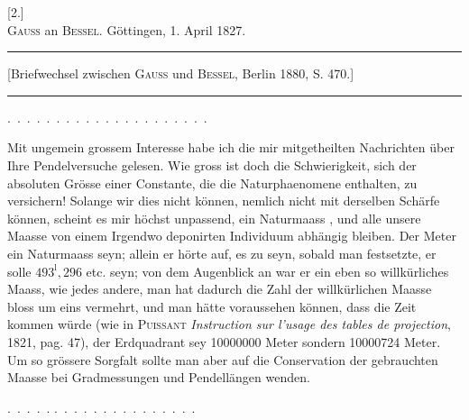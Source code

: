 \clearpage\begingroup{}
\begin{center}
[2.]\\[.7em]
\textsc{Gauss} an \textsc{Bessel}. Göttingen, 1. April 1827.
\par\medskip\rule{.78\textwidth}{.35pt}\par
{\small [Briefwechsel zwischen \textsc{Gauss} und \textsc{Bessel}, Berlin 1880, S. 470.]}\par
\rule{.78\textwidth}{.35pt}
\end{center}
\noindent .\ .\ .\ .\ .\ .\ .\ .\ .\ .\ .\ .\ .\ .\ .\ .\ .\ .\ .\ .\ .
\par\noindent\hspace*{\parindent}Mit ungemein grossem Interesse habe ich die mir mitgetheilten Nachrichten
über Ihre Pendelversuche gelesen. Wie gross ist doch die Schwierigkeit,
sich der absoluten Grösse einer Constante, die die Naturphaenomene
enthalten, zu versichern! Solange wir dies nicht können, nemlich nicht mit
derselben Schärfe können, scheint es mir höchst unpassend, ein Naturmaass
, und  alle unsere Maasse
von einem Irgendwo deponirten Individuum abhängig bleiben. Der 
Meter  ein Naturmaass seyn; allein er hörte auf, es zu seyn,
sobald man festsetzte, er solle \(493^{\mathrm{l}}{,}296\) etc. seyn; von dem Augenblick an
war er ein eben so willkürliches Maass, wie jedes andere, man hat dadurch
die Zahl der willkürlichen Maasse bloss um eins vermehrt, und man hätte
voraussehen können, dass die Zeit kommen würde (wie in \textsc{Puissant} \textit{Instruction
sur l’usage des tables de projection}, 1821, pag. 47), der Erdquadrant sey 
10000000 Meter sondern 10000724 Meter. Um so grössere Sorgfalt sollte
man aber auf die Conservation der gebrauchten Maasse bei Gradmessungen
und Pendellängen wenden.
\par\noindent .\ .\ .\ .\ .\hspace{.75em} .\ .\ .\ .\ .\ .\ .\ .\ .\ .\ .\ .\ .\ .\ .
\clearpage\endgroup

